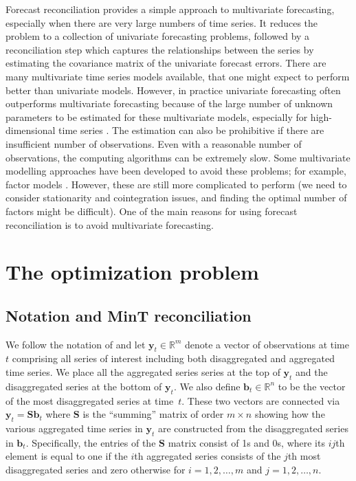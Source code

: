 \documentclass[twocolumn]{svjour3}
\begin{document}
{\color{red}
	Forecast reconciliation provides a simple approach to multivariate forecasting, especially when there are very large numbers of time series. It reduces the problem to a collection of univariate forecasting problems, followed by a reconciliation step  which captures the relationships between the series by estimating the covariance matrix of the univariate forecast errors. There are many multivariate time series models available, that one might expect to perform better than univariate models. However, in practice univariate forecasting often outperforms multivariate forecasting because of the large number of unknown parameters to be estimated for these multivariate models, especially for high-dimensional time series \citep{Chatfield2000}. The estimation can also be prohibitive if there are insufficient number of observations. Even with a reasonable number of observations, the computing algorithms can be extremely slow. Some multivariate modelling approaches have been developed to avoid these problems; for example, factor models \citep[see][Econometrica]{Bai2003}. However, these are still more complicated to perform (we need to consider stationarity and cointegration issues, and finding the optimal number of factors might be difficult). One of the main reasons for using forecast reconciliation is to avoid multivariate forecasting.
}
\section{The optimization problem}

\subsection{Notation and MinT reconciliation}

We follow the notation of \citet{Wick2018} and let $\bm{y}_t \in \mathbb{R}^m$ denote a vector of observations at time $t$ comprising all series of interest including both disaggregated and aggregated time series. We place all the aggregated series series at the top of $\bm{y}_t$ and the disaggregated series at the bottom of  $\bm{y}_t$. We also define $\bm{b}_t \in \mathbb{R}^n$ to be the vector of the most disaggregated series at time~$t$. These two vectors are connected via $\bm{y}_t=\bm{S}\bm{b}_t$ where $\bm{S}$ is the ``summing'' matrix of order $m \times n$ showing how the various aggregated time series in $\bm{y}_t$ are constructed from the disaggregated series in $\bm{b}_t$. Specifically, the entries of the $\bm{S}$ matrix consist of 1s and 0s, where its $ij$th element is equal to one if the $i$th aggregated series consists of the $j$th most disaggregated series and zero otherwise for $i = 1, 2, \dots, m$ and $j = 1, 2, \dots, n$.
\end{document}
